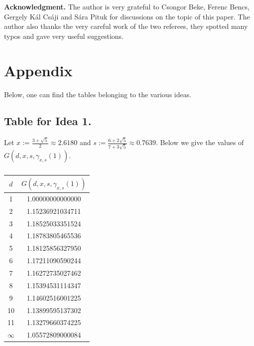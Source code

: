 \documentclass[12pt,a4paper]{amsart}
\numberwithin{equation}{section}
\theoremstyle{plain}
\theoremstyle{definition}
\newcommand{\1}{\textbf{1}}
\begin{document}
\bigskip

\noindent \textbf{Acknowledgment.} The author is very grateful to Csongor Beke, Ferenc Bencs, Gergely K\'al Cs\'aji and S\'ara Pituk for discussions on the topic of this paper. The author also thanks the very careful work of the two referees, they spotted many typos and gave very useful suggestions. 




\newpage

\section{Appendix}

Below, one can find the tables belonging to the various ideas.

\subsection{Table for Idea 1.} Let $x:=\frac{3+\sqrt{5}}{2}\approx 2.6180$ and $s:=\frac{6+2\sqrt{5}}{7+3\sqrt{5}} \approx 0.7639$. Below we give the values of $G(d,x,s,\gamma_{x,s}(1))$.
\bigskip

\begin{table}[!h]
\begin{center}
\begin{tabular}{|c|c|} \hline
$d$ & $G(d,x,s,\gamma_{x,s}(1))$ \\ \hline
1 & 1.00000000000000 \\ \hline
2 & 1.15236921034711  \\ \hline
3 & 1.18525033351524  \\ \hline
4 & 1.18783805465536  \\ \hline
5 & 1.18125856327950  \\ \hline
6 & 1.17211090590244  \\ \hline
7 & 1.16272735027462  \\ \hline
8 & 1.15394531114347  \\ \hline
9 & 1.14602516001225  \\ \hline
10 & 1.13899595137302  \\ \hline
11 & 1.13279660374225  \\ \hline
$\infty$ & 1.05572809000084  \\ \hline
\end{tabular}
\caption{}
\end{center}
\end{table}
\bigskip
\end{document}
